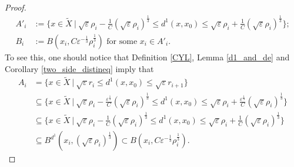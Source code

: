 \documentclass[11pt]{amsart}
\theoremstyle{plain}
\theoremstyle{definition}
\numberwithin{equation}{section}
\renewcommand{\leq}{\leqslant}
\begin{document}
\begin{proof}
\begin{align}
A'_i&:=\bigg\{x\in \tilde{X}\ \bigg|\ \sqrt{\varepsilon}\rho_i-\frac{1}{C}(\sqrt{\varepsilon}\rho_i)^{\frac{1}{3}}\leq d^{1}(x,x_0)\leq \sqrt{\varepsilon}\rho_i+\frac{1}{C}(\sqrt{\varepsilon}\rho_i)^{\frac{1}{3}}\bigg\};\\
B_i&:=B(x_i,C\varepsilon^{-\frac{1}{3}}\rho_i^{\frac{1}{3}})\mbox{ for some }x_i\in A'_{i}.
\end{align}
To see this, one should notice that Definition \ref{CYL}, Lemma \ref{d1_and_de} and Corollary \ref{two_side_distineq} imply that
\begin{align}
A_i&= \big\{x\in\tilde{X}\ \big| 
\ \sqrt{\varepsilon} r_i\leq
   d^1(x,x_0)\leq \sqrt{\varepsilon} r_{i+1}\big\}\nonumber\\
   &\subseteq\bigg\{x\in\tilde{X}\ \bigg|\  
\sqrt{\varepsilon}\rho_i-\frac{\varepsilon^{\frac{1}{3}}}{C}(\sqrt{\varepsilon}\rho_i)^{\frac{1}{3}}\leq
   d^1(x,x_0)\leq\sqrt{\varepsilon}\rho_i+\frac{\varepsilon^{\frac{1}{3}}}{C}(\sqrt{\varepsilon}\rho_i)^{\frac{1}{3}}\bigg\}\nonumber\\
  &\subseteq \bigg\{x\in\tilde{X}\ \bigg|\  
\sqrt{\varepsilon}\rho_i-\frac{1}{C}(\sqrt{\varepsilon}\rho_i)^{\frac{1}{3}}\leq
   d^1(x,x_0)\leq\sqrt{\varepsilon}\rho_i+\frac{1}{C}(\sqrt{\varepsilon}\rho_i)^{\frac{1}{3}}\bigg\}\nonumber\\
   &\subseteq B^{d^1}(x_i,(\sqrt{\varepsilon}\rho_i)^{\frac{1}{3}})\subset B(x_i,C \varepsilon^{-\frac{1}{3}}\rho_i^{\frac{1}{3}}).\nonumber
\end{align}



\end{proof}
\end{document}
